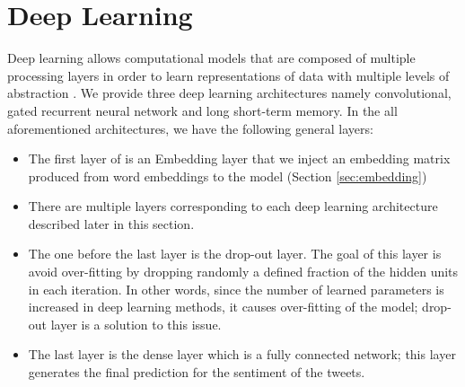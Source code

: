 \documentclass[8pt,conference,compsocconf]{IEEEtran}
\begin{document}

\section{Deep Learning} \label{sec:deeplearning}
Deep learning allows computational models that are composed of multiple processing layers in order to learn representations of data with multiple levels of abstraction \cite{deeplearning}. We provide three deep learning architectures namely convolutional, gated recurrent neural network and long short-term memory. In the all aforementioned architectures, we have the following general layers:
\begin{itemize}
	\item The first layer of is an Embedding layer that we inject an embedding matrix produced from word embeddings to the model (Section \ref{sec:embedding})
	\item There are multiple layers corresponding to each deep learning architecture described later in this section.
	\item The one before the last layer is the drop-out layer. The goal of this layer is avoid over-fitting by dropping randomly a defined fraction of the hidden units in each iteration. In other words, since the number of learned parameters is increased in deep learning methods, it causes over-fitting of the model; drop-out layer is a solution to this issue. 
	\item The last layer is the dense layer which is a fully connected network; this layer generates the final prediction for the sentiment of the tweets. 
\end{itemize}
\end{document}
